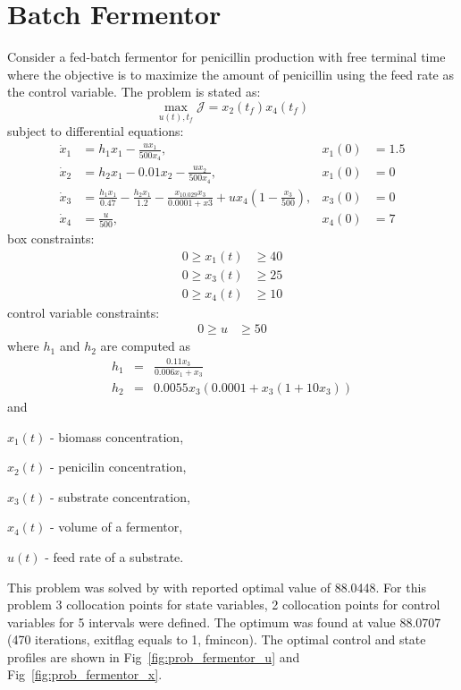 \section{Batch Fermentor}
\label{sec:prob_fermentor}
Consider a fed-batch fermentor for penicillin production with free terminal time~\citep{ban05} where the objective is to maximize the amount of penicillin using the feed rate as the control variable. The problem is stated as: 
\begin{equation}
\max_{u(t),t_f} \mathcal{J} = x_{2}(t_{f})x_{4}(t_{f})
\end{equation}
subject to differential equations:
\begin{align}
\dot{x}_1 & = 
h_1x_1-\frac{u x_1}{500 x_4}, &
x_1(0) &= 1.5  \\
\dot{x}_2 & = 
h_2x_1-0.01x_2-\frac{ux_2}{500x_4}, &
x_1(0) &= 0  \\
\dot{x}_3 &= \frac{h_1x_1}{0.47}-\frac{h_2x_1}{1.2}-\frac{x_10.029x_3}{0.0001+x3}+ux_4(1-\frac{x_3}{500}), &
x_3(0) &= 0 \\ 
\dot{x}_4 &= \frac{u}{500}, &
x_4(0) &= 7
\end{align}
box constraints:
\begin{align}
0 \ge x_1(t) &\ge 40 \\
0 \ge x_3(t) &\ge 25 \\
0 \ge x_4(t) &\ge 10 
\end{align}
control variable constraints:
\begin{align}
0 \ge u &\ge 50 
\end{align}
where $h_1$ and $h_2$ are computed as
\begin{eqnarray} 
h_1 &=& \frac{0.11x_3}{0.006x_1+x_3} \\
h_2 &=& 0.0055x_3(0.0001+x_3(1+10x_3))
\end{eqnarray}
and 
\begin{description}
	\item $x_1(t)$ - biomass concentration,
	\item $x_2(t)$ - penicilin concentration,
	\item $x_3(t)$ - substrate concentration,
	\item $x_4(t)$ - volume of a fermentor,
	\item $u(t)$ - feed rate of a substrate.
\end{description}

This problem was solved by\citep{rut10} with reported optimal value of 88.0448. For this problem 3 collocation points for state variables, 2 collocation points for control variables for 5 intervals were defined. The optimum was found at value 88.0707 (470 iterations, exitflag equals to 1, fmincon). The optimal control and state profiles are shown in Fig~\ref{fig:prob_fermentor_u} and Fig~\ref{fig:prob_fermentor_x}.


